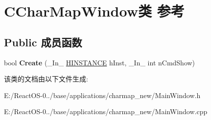 \hypertarget{class_c_char_map_window}{}\section{C\+Char\+Map\+Window类 参考}
\label{class_c_char_map_window}
\subsection*{Public 成员函数}
\begin{DoxyCompactItemize}
\item 
\mbox{\label{class_c_char_map_window_ada30aa7d410e7cfd5544b96f7a3f4fdd}} 
bool {\bfseries Create} (\+\_\+\+In\+\_\+ \hyperlink{interfacevoid}{H\+I\+N\+S\+T\+A\+N\+CE} h\+Inst, \+\_\+\+In\+\_\+ int n\+Cmd\+Show)
\end{DoxyCompactItemize}


该类的文档由以下文件生成\+:\begin{DoxyCompactItemize}
\item 
E\+:/\+React\+O\+S-\/0../base/applications/charmap\+\_\+new/Main\+Window.\+h\item 
E\+:/\+React\+O\+S-\/0../base/applications/charmap\+\_\+new/Main\+Window.\+cpp\end{DoxyCompactItemize}
